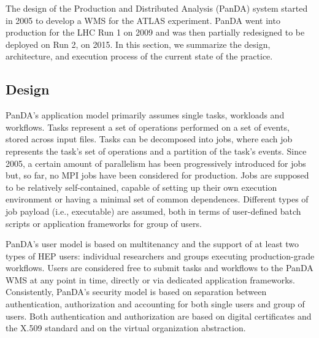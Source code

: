 
The design of the Production and Distributed Analysis (PanDA) system started in
2005 to develop a WMS for the ATLAS experiment. PanDA went into production for
the LHC Run 1 on 2009 and was then partially redesigned to be deployed on Run 2,
on 2015. In this section, we summarize the design, architecture, and execution
process of the current state of the practice.


\subsection{Design}
\label{ssec:panda_design}


PanDA's application model primarily assumes single tasks, workloads and
workflows. Tasks represent a set of operations performed on a set of events,
stored across input files. Tasks can be decomposed into jobs, where each job
represents the task's set of operations and a partition of the task's events.
Since 2005, a certain amount of parallelism has been progressively introduced
for jobs~\cite{multithreaded_jobs} but, so far, no MPI jobs have been considered
for production. Jobs are supposed to be relatively self-contained, capable of
setting up their own execution environment or having a minimal set of common
dependences. Different types of job payload (i.e., executable) are assumed, both
in terms of user-defined batch scripts or application frameworks for group of
users.

PanDA's user model is based on multitenancy and the support of at least two
types of HEP users: individual researchers and groups executing production-grade
workflows. Users are considered free to submit tasks and workflows to the PanDA
WMS at any point in time, directly or via dedicated application frameworks.
Consistently, PanDA's security model is based on separation between
authentication, authorization and accounting for both single users and group of
users. Both authentication and authorization are based on digital certificates
and the X.509 standard and on the virtual organization abstraction.


